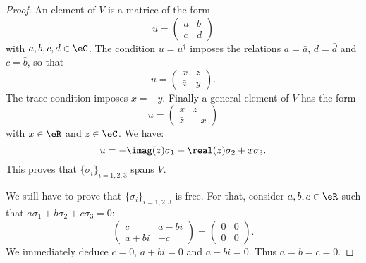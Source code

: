 \begin{proof}
    An element of \( V\) is a matrice of the form
    \begin{equation}
        u=\begin{pmatrix}
            a    &   b    \\ 
            c    &   d    
        \end{pmatrix}
    \end{equation}
    with \( a,b,c,d\in \eC\). The condition \( u=u^{\dag}\) imposes the relations \( a=\bar a\), \( d=\bar d\) and \( c=\bar b\), so that
    \begin{equation}
        u=\begin{pmatrix}
            x    &   z    \\ 
            \bar z    &   y    
        \end{pmatrix}.
    \end{equation}
    The trace condition imposes \( x=-y\). Finally a general element of \( V\) has the form
    \begin{equation}
        u=\begin{pmatrix}
            x    &   z    \\ 
            \bar z    &   -x    
        \end{pmatrix}
    \end{equation}
    with \( x\in \eR\) and \( z\in \eC\). We have:
    \begin{equation}
        u=-\imag(z)\sigma_1+\real(z)\sigma_2+x\sigma_3.
    \end{equation}
    This proves that \( \{ \sigma_i \}_{i=1,2,3}\) spans \( V\). 
    
    We still have to prove that \( \{ \sigma_i \}_{i=1,2,3}\) is free. For that, consider \( a,b,c\in \eR\) such that \( a\sigma_1+b\sigma_2+c\sigma_3=0\):
    \begin{equation}
        \begin{pmatrix}
            c    &   a-bi    \\ 
            a+bi    &   -c    
        \end{pmatrix}=\begin{pmatrix}
            0    &   0    \\ 
            0    &   0    
        \end{pmatrix}.
    \end{equation}
    We immediately deduce \( c=0\), \( a+bi=0\) and \( a-bi=0\). Thus \( a=b=c=0\).
\end{proof}

